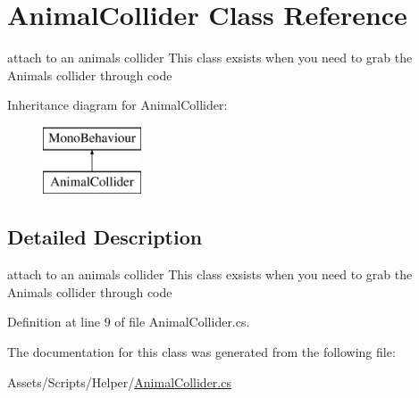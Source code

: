\hypertarget{class_animal_collider}{}\section{Animal\+Collider Class Reference}
\label{class_animal_collider}


attach to an animal\textquotesingle{}s collider This class exsists when you need to grab the Animals\textquotesingle{} collider through code  


Inheritance diagram for Animal\+Collider\+:\begin{figure}[H]
\begin{center}
\leavevmode
\includegraphics[height=2.000000cm]{class_animal_collider}
\end{center}
\end{figure}


\subsection{Detailed Description}
attach to an animal\textquotesingle{}s collider This class exsists when you need to grab the Animals\textquotesingle{} collider through code 



Definition at line 9 of file Animal\+Collider.\+cs.



The documentation for this class was generated from the following file\+:\begin{DoxyCompactItemize}
\item 
Assets/\+Scripts/\+Helper/\mbox{\hyperlink{_animal_collider_8cs}{Animal\+Collider.\+cs}}\end{DoxyCompactItemize}
